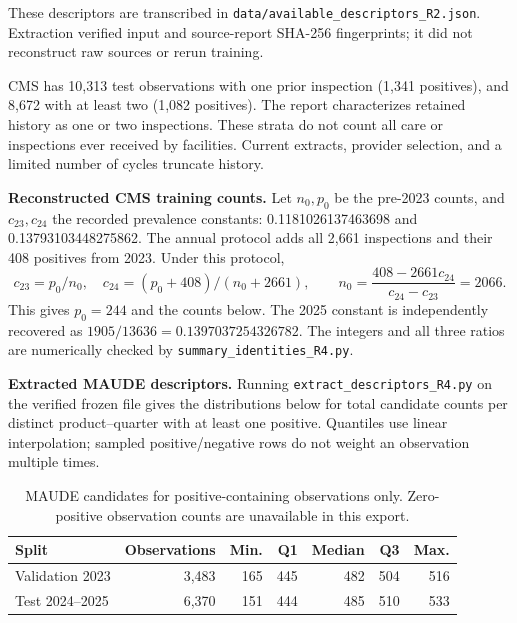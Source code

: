 \documentclass[10pt,a4paper]{article}
\newcommand{\src}[1]{{\small\nolinkurl{#1}}}
\begin{document}
These descriptors are transcribed in \src{data/available_descriptors_R2.json}. Extraction verified input and source-report SHA-256 fingerprints; it did not reconstruct raw sources or rerun training.

CMS has 10,313 test observations with one prior inspection (1,341 positives), and 8,672 with at least two (1,082 positives). The report characterizes retained history as one or two inspections. These strata do not count all care or inspections ever received by facilities. Current extracts, provider selection, and a limited number of cycles truncate history\cite{hgbanalysis,hgbresults}.

\textbf{Reconstructed CMS training counts.} Let $n_0,p_0$ be the pre-2023 counts, and $c_{23},c_{24}$ the recorded prevalence constants: 0.1181026137463698 and 0.13793103448275862. The annual protocol adds all 2,661 inspections and their 408 positives from 2023\cite{hgbcode}. Under this protocol,
\[
 c_{23}=p_0/n_0,\quad c_{24}=(p_0+408)/(n_0+2661),\qquad
 n_0=\frac{408-2661c_{24}}{c_{24}-c_{23}}=2066.
\]
This gives $p_0=244$ and the counts below. The 2025 constant is independently recovered as $1905/13636=0.1397037254326782$. The integers and all three ratios are numerically checked by \src{summary_identities_R4.py}.
\begin{table}[!htbp]\centering\small
\caption{CMS counts reconstructed algebraically under the stated protocol, not read directly from training rows.}

\end{table}

\par{}
\textbf{Extracted MAUDE descriptors.} Running \src{extract_descriptors_R4.py} on the verified frozen file gives the distributions below for total candidate counts per distinct product--quarter with at least one positive. Quantiles use linear interpolation; sampled positive/negative rows do not weight an observation multiple times.

\begin{table}[!htbp]\centering\small
\caption{MAUDE candidates for positive-containing observations only. Zero-positive observation counts are unavailable in this export.}
\begin{tabular}{@{}lrrrrrr@{}}\toprule
Split & Observations & Min. & Q1 & Median & Q3 & Max.\\\midrule
Validation 2023 & 3,483 & 165 & 445 & 482 & 504 & 516\\
Test 2024--2025 & 6,370 & 151 & 444 & 485 & 510 & 533\\\bottomrule
\end{tabular}
\end{table}
\end{document}
